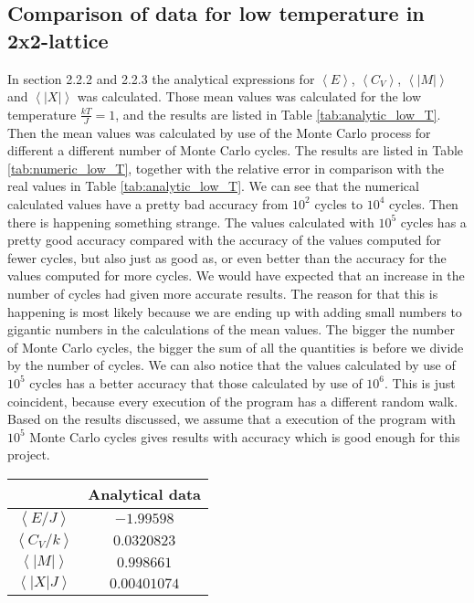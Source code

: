 \documentclass[12pt]{article}
\begin{document}
\begin{flushleft}
\subsection{Comparison of data for low temperature in 2x2-lattice}
In section 2.2.2 and 2.2.3 the analytical expressions for $\left<E\right>$, $\left<C_V\right>$, $\left<|M|\right>$ and $\left<|X|\right>$ was calculated. Those mean values was calculated for the low temperature $\frac{kT}{J} = 1$, and the results are listed in Table \ref{tab:analytic_low_T}. Then the mean values was calculated by use of the Monte Carlo process for different a different number of Monte Carlo cycles. The results are listed in Table \ref{tab:numeric_low_T}, together with the relative error in comparison with the real values in Table \ref{tab:analytic_low_T}. We can see that the numerical calculated values have a pretty bad accuracy from $10^2$ cycles to $10^4$ cycles. Then there is happening something strange. The values calculated with $10^5$ cycles has a pretty good accuracy compared with the accuracy of the values computed for fewer cycles, but also just as good as, or even better than the accuracy for the values computed for more cycles. We would have expected that an increase in the number of cycles had given more accurate results. The reason for that this is happening is most likely because we are ending up with adding small numbers to gigantic numbers in the calculations of the mean values. The bigger the number of Monte Carlo cycles, the bigger the sum of all the quantities is before we divide by the number of cycles. We can also notice that the values calculated by use of $10^5$ cycles has a better accuracy that those calculated by use of $10^6$. This is just coincident, because every execution of the program has a different random walk. Based on the results discussed, we assume that a execution of the program with $10^5$ Monte Carlo cycles gives results with accuracy which is good enough for this project.\\
\vspace{5mm}

\begin{table}[!h]
\begin{center}
\begin{tabular}{| c | c |}
	\hline
	 & \textbf{Analytical data} \\
	\hline	
	 $\left<E/J\right>$ & $-1.99598$\\
	 $\left<C_V/k\right>$ & $0.0320823$\\
	 $\left<|M|\right>$ & $0.998661$ \\
	 $\left<|X|J\right>$ & $0.00401074$\\


\end{tabular}
\end{center}
\end{table}
\end{flushleft}
\end{document}
